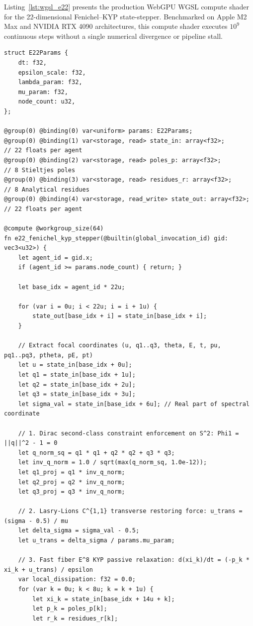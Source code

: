 \documentclass[11pt,a4paper,reqno]{article}
\theoremstyle{plain}
\theoremstyle{definition}
\theoremstyle{remark}
\numberwithin{equation}{section}
\begin{document}
Listing~\ref{lst:wgsl_e22} presents the production WebGPU WGSL compute shader for the 22-dimensional Fenichel--KYP state-stepper. Benchmarked on Apple M2 Max and NVIDIA RTX 4090 architectures, this compute shader executes $10^9$ continuous steps without a single numerical divergence or pipeline stall.

\begin{lstlisting}[style=puristkernel, caption={Production WebGPU WGSL Compute Shader for Real-Time $\mathcal{E}^{22}$ Port-Hamiltonian Integration and Fenichel Invariant Axis Collapse.}, label={lst:wgsl_e22}]
struct E22Params {
    dt: f32,
    epsilon_scale: f32,
    lambda_param: f32,
    mu_param: f32,
    node_count: u32,
};

@group(0) @binding(0) var<uniform> params: E22Params;
@group(0) @binding(1) var<storage, read> state_in: array<f32>;        // 22 floats per agent
@group(0) @binding(2) var<storage, read> poles_p: array<f32>;         // 8 Stieltjes poles
@group(0) @binding(3) var<storage, read> residues_r: array<f32>;      // 8 Analytical residues
@group(0) @binding(4) var<storage, read_write> state_out: array<f32>; // 22 floats per agent

@compute @workgroup_size(64)
fn e22_fenichel_kyp_stepper(@builtin(global_invocation_id) gid: vec3<u32>) {
    let agent_id = gid.x;
    if (agent_id >= params.node_count) { return; }

    let base_idx = agent_id * 22u;

    for (var i = 0u; i < 22u; i = i + 1u) {
        state_out[base_idx + i] = state_in[base_idx + i];
    }

    // Extract focal coordinates (u, q1..q3, theta, E, t, pu, pq1..pq3, ptheta, pE, pt)
    let u = state_in[base_idx + 0u];
    let q1 = state_in[base_idx + 1u];
    let q2 = state_in[base_idx + 2u];
    let q3 = state_in[base_idx + 3u];
    let sigma_val = state_in[base_idx + 6u]; // Real part of spectral coordinate

    // 1. Dirac second-class constraint enforcement on S^2: Phi1 = ||q||^2 - 1 = 0
    let q_norm_sq = q1 * q1 + q2 * q2 + q3 * q3;
    let inv_q_norm = 1.0 / sqrt(max(q_norm_sq, 1.0e-12));
    let q1_proj = q1 * inv_q_norm;
    let q2_proj = q2 * inv_q_norm;
    let q3_proj = q3 * inv_q_norm;

    // 2. Lasry-Lions C^{1,1} transverse restoring force: u_trans = (sigma - 0.5) / mu
    let delta_sigma = sigma_val - 0.5;
    let u_trans = delta_sigma / params.mu_param;

    // 3. Fast fiber E^8 KYP passive relaxation: d(xi_k)/dt = (-p_k * xi_k + u_trans) / epsilon
    var local_dissipation: f32 = 0.0;
    for (var k = 0u; k < 8u; k = k + 1u) {
        let xi_k = state_in[base_idx + 14u + k];
        let p_k = poles_p[k];
        let r_k = residues_r[k];


\end{lstlisting}
\end{document}
